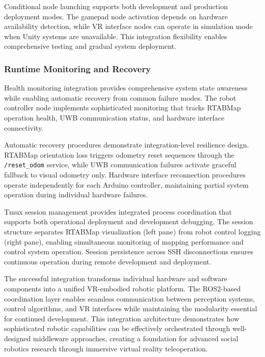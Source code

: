 Conditional node launching supports both development and production deployment modes. The gamepad node activation depends on hardware availability detection, while VR interface nodes can operate in simulation mode when Unity systems are unavailable. This integration flexibility enables comprehensive testing and gradual system deployment.

\subsubsection{Runtime Monitoring and Recovery}

Health monitoring integration provides comprehensive system state awareness while enabling automatic recovery from common failure modes. The robot controller node implements sophisticated monitoring that tracks RTABMap operation health, UWB communication status, and hardware interface connectivity.

Automatic recovery procedures demonstrate integration-level resilience design. RTABMap orientation loss triggers odometry reset sequences through the \texttt{/reset\_odom} service, while UWB communication failures activate graceful fallback to visual odometry only. Hardware interface reconnection procedures operate independently for each Arduino controller, maintaining partial system operation during individual hardware failures.

Tmux session management provides integrated process coordination that supports both operational deployment and development debugging. The session structure separates RTABMap visualization (left pane) from robot control logging (right pane), enabling simultaneous monitoring of mapping performance and control system operation. Session persistence across SSH disconnections ensures continuous operation during remote development and deployment.

The successful integration transforms individual hardware and software components into a unified VR-embodied robotic platform. The ROS2-based coordination layer enables seamless communication between perception systems, control algorithms, and VR interfaces while maintaining the modularity essential for continued development. This integration architecture demonstrates how sophisticated robotic capabilities can be effectively orchestrated through well-designed middleware approaches, creating a foundation for advanced social robotics research through immersive virtual reality teleoperation.
